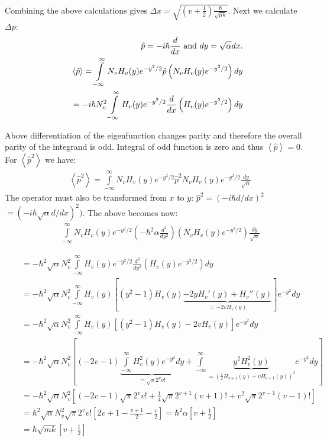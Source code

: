 \begin{enumerate}
Combining the above calculations gives $\Delta x = \sqrt{\left(v + \frac{1}{2}\right)\frac{\hbar}{\sqrt{\mu k}}}$. Next we calculate $\Delta p$:
\begin{eqnarray}
\nonumber
& & \hat{p} = -i\hbar\frac{d}{dx}\textnormal{ and }dy = \sqrt{\alpha}dx.\\
\nonumber
& & \left<\hat{p}\right> = \int\limits_{-\infty}^{\infty} N_vH_v(y)e^{-y^2/2}\hat{p}\left(N_vH_v(y)e^{-y^2/2}\right)dy\\
\nonumber
& & = -i\hbar N_v^2\int\limits_{-\infty}^{\infty}H_v(y)e^{-y^2/2}\frac{d}{dx}\left(H_v(y)e^{-y^2/2}\right)dy
\end{eqnarray}

Above differentiation of the eigenfunction changes parity and therefore the overall parity of the integrand is odd. Integral of odd function is zero
and thus $\left<\hat{p}\right> = 0$. For $\left<\hat{p}^2\right>$ we have:
\begin{eqnarray}
\nonumber
& & \left<\hat{p}^2\right> = \int\limits_{-\infty}^{\infty}N_vH_v(y)e^{-y^2/2}\hat{p}^2 N_vH_v(y)e^{-y^2/2}\frac{dy}{\sqrt{\alpha}}
\end{eqnarray}
The operator must also be transformed from $x$ to $y$: $\hat{p}^2 = (-i\hbar d/dx)^2$ $= (-i\hbar \sqrt{\alpha} d/dx)^2)$. The above becomes now:
\begin{eqnarray}
\nonumber
& & \int\limits_{-\infty}^{\infty}N_vH_v(y)e^{-y^2/2}\left(-\hbar^2\alpha\frac{d^2}{dy^2}\right)\left(N_vH_v(y)e^{-y^2/2}\right)\frac{dy}{\sqrt{\alpha}}
\end{eqnarray}

\begin{eqnarray}
\nonumber
& & = -\hbar^2\sqrt{\alpha}N_v^2\int\limits_{-\infty}^{\infty}H_v(y)e^{-y^2/2}\frac{d^2}{dy^2}\left(H_v(y)e^{-y^2/2}\right)dy\\
\nonumber
& & = -\hbar^2\sqrt{\alpha}N_v^2\int\limits_{-\infty}^{\infty}H_v(y)\left[(y^2 - 1)H_v(y)\underbrace{-2yH_v'(y) + H_v''(y)}_{=-2vH_v(y)}\right]e^{-y^2}dy\\
\nonumber
& & = -\hbar^2\sqrt{\alpha}N_v^2\int\limits_{-\infty}^{\infty}H_v(y)\left[(y^2 - 1)H_v(y) - 2vH_v(y)\right]e^{-y^2}dy\\
\nonumber
& & = -\hbar^2\sqrt{\alpha}N_v^2\left[(-2v-1)\underbrace{\int\limits_{-\infty}^{\infty}H_v^2(y)e^{-y^2}dy}_{=\sqrt{\pi}2^vv!} + \int\limits_{-\infty}^{\infty}\underbrace{y^2H_v^2(y)}_{=\left(\frac{1}{2}H_{v+1}(y) + vH_{v-1}(y)\right)^2}e^{-y^2}dy\right]\\
\nonumber
& & = -\hbar^2\sqrt{\alpha}N_v^2\left[(-2v-1)\sqrt{\pi}2^vv! + \frac{1}{4}\sqrt{\pi}2^{v+1}(v+1)! + v^2\sqrt{\pi}2^{v-1}(v-1)!\right]\\
\nonumber
& & = \hbar^2\sqrt{\alpha}N_v^2\sqrt{\pi}2^vv!\left[2v+1-\frac{v+1}{2} - \frac{v}{2}\right] = \hbar^2\alpha\left[v + \frac{1}{2}\right]\\
\nonumber
& & = \hbar\sqrt{mk}\left[v + \frac{1}{2}\right]
\end{eqnarray}


\end{enumerate}
